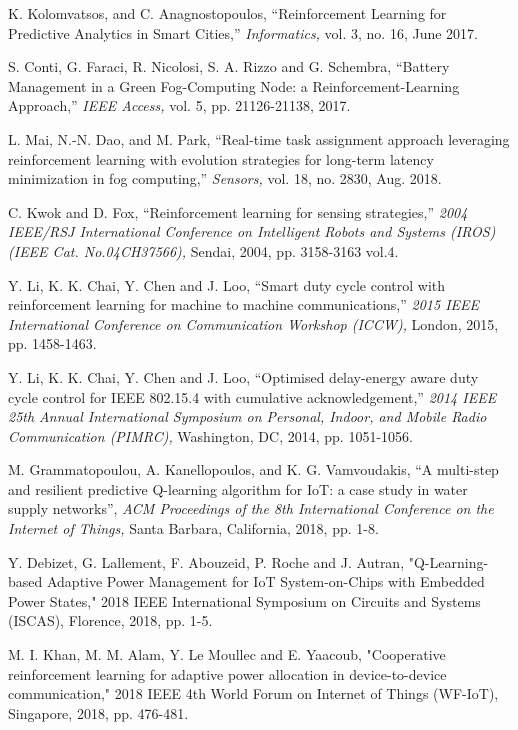 \documentclass[journal]{IEEEtran}
\begin{document}
\begin{thebibliography}{1}
K. Kolomvatsos, and C. Anagnostopoulos, ``Reinforcement Learning for Predictive Analytics in
Smart Cities,'' \emph{Informatics,} vol. 3, no. 16, June 2017.

S. Conti, G. Faraci, R. Nicolosi, S. A. Rizzo and G. Schembra, ``Battery Management in a Green Fog-Computing Node: a Reinforcement-Learning Approach,'' \emph{IEEE Access,} vol. 5, pp. 21126-21138, 2017.

L. Mai, N.-N. Dao, and M. Park, ``Real-time task assignment approach leveraging reinforcement learning with evolution strategies for long-term latency minimization in fog computing,'' \emph{Sensors,} vol. 18, no. 2830, Aug. 2018.

C. Kwok and D. Fox, ``Reinforcement learning for sensing strategies,'' \emph{2004 IEEE/RSJ International Conference on Intelligent Robots and Systems (IROS) (IEEE Cat. No.04CH37566),} Sendai, 2004, pp. 3158-3163 vol.4.

Y. Li, K. K. Chai, Y. Chen and J. Loo, ``Smart duty cycle control with reinforcement learning for machine to machine communications,'' \emph{2015 IEEE International Conference on Communication Workshop (ICCW),} London, 2015, pp. 1458-1463.

Y. Li, K. K. Chai, Y. Chen and J. Loo, ``Optimised delay-energy aware duty cycle control for IEEE 802.15.4 with cumulative acknowledgement,'' \emph{2014 IEEE 25th Annual International Symposium on Personal, Indoor, and Mobile Radio Communication (PIMRC),} Washington, DC, 2014, pp. 1051-1056.

M. Grammatopoulou, A. Kanellopoulos, and K. G. Vamvoudakis, ``A multi-step and resilient predictive Q-learning algorithm for IoT: a case study in water supply networks'', \emph{ACM Proceedings of the 8th International Conference on the Internet of Things,} Santa Barbara, California, 2018, pp. 1-8.

Y. Debizet, G. Lallement, F. Abouzeid, P. Roche and J. Autran, "Q-Learning-based Adaptive Power Management for IoT System-on-Chips with Embedded Power States," 2018 IEEE International Symposium on Circuits and Systems (ISCAS), Florence, 2018, pp. 1-5.

M. I. Khan, M. M. Alam, Y. Le Moullec and E. Yaacoub, "Cooperative reinforcement learning for adaptive power allocation in device-to-device communication," 2018 IEEE 4th World Forum on Internet of Things (WF-IoT), Singapore, 2018, pp. 476-481.


\end{thebibliography}
\end{document}
